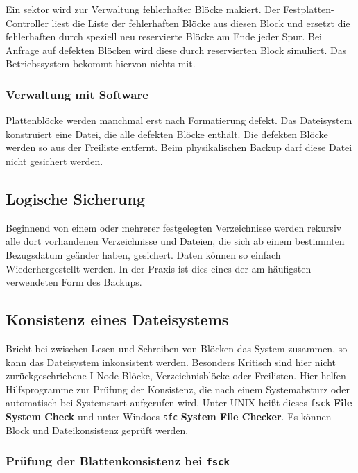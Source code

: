 Ein sektor wird zur Verwaltung fehlerhafter Blöcke makiert. Der
Festplatten-Controller liest die Liste der fehlerhaften Blöcke aus diesen Block
und ersetzt die fehlerhaften durch speziell neu reservierte Blöcke am Ende
jeder Spur. Bei Anfrage auf defekten Blöcken wird diese durch reservierten
Block simuliert. Das Betriebssystem bekommt hiervon nichts mit.

\subsubsection{Verwaltung mit Software}

Plattenblöcke werden manchmal erst nach Formatierung defekt. Das Dateisystem
konstruiert eine Datei, die alle defekten Blöcke enthält. Die defekten Blöcke
werden so aus der Freiliste entfernt. Beim physikalischen Backup darf diese
Datei nicht gesichert werden.

\subsection{Logische Sicherung}

Beginnend von einem oder mehrerer festgelegten Verzeichnisse werden rekursiv
alle dort vorhandenen Verzeichnisse und Dateien, die sich ab einem bestimmten
Bezugsdatum geänder haben, gesichert. Daten können so einfach Wiederhergestellt
werden. In der Praxis ist dies eines der am häufigsten verwendeten Form des
Backups.

\subsection{Konsistenz eines Dateisystems}

Bricht bei zwischen Lesen und Schreiben von Blöcken das System zusammen, so
kann das Dateisystem inkonsistent werden. Besonders Kritisch sind hier nicht
zurückgeschriebene I-Node Blöcke, Verzeichnisblöcke oder Freilisten. Hier
helfen Hilfsprogramme zur Prüfung der Konsistenz, die nach einem Systemabsturz
oder automatisch bei Systemstart aufgerufen wird. Unter UNIX heißt dieses
\texttt{fsck} \textbf{File System Check} und unter Windoes \texttt{sfc}
\textbf{System File Checker}. Es können Block und Dateikonsistenz geprüft
werden.

\subsubsection{Prüfung der Blattenkonsistenz bei \texttt{fsck}}

